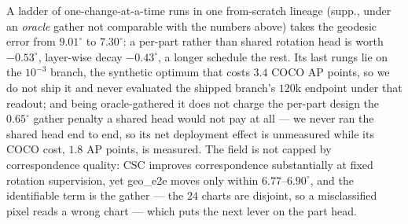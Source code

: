 A ladder of one-change-at-a-time runs in one from-scratch lineage (supp., under an \emph{oracle}
gather not comparable with the numbers above) takes the geodesic error from $9.01^\circ$ to
$7.30^\circ$: a per-part rather than shared rotation head is worth $-0.53^\circ$, layer-wise decay
$-0.43^\circ$, a longer schedule the rest. Its last rungs lie on the $10^{-3}$ branch, the
synthetic optimum that costs $3.4$ COCO AP points, so we do not ship it and never evaluated the
shipped branch's $120$k endpoint under that readout; and being oracle-gathered it does not charge
the per-part design the $0.65^\circ$ gather penalty a shared head would not pay at all --- we never
ran the shared head end to end, so its net deployment effect is unmeasured while its COCO cost,
$1.8$ AP points, is measured. The field is not capped by correspondence quality: CSC improves
correspondence substantially at fixed rotation supervision, yet geo\_e2e moves only within
$6.77$--$6.90^\circ$, and the identifiable term is the gather --- the $24$ charts are disjoint, so
a misclassified pixel reads a wrong chart --- which puts the next lever on the part head.
